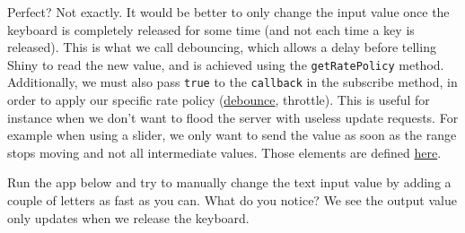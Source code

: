 \documentclass[
]{book}
\begin{document}
Perfect? Not exactly. It would be better to only change the input value once the keyboard is completely released for some time (and not each time a key is released). This is what we call debouncing, which allows a delay before telling Shiny to read the new value, and is achieved using the \texttt{getRatePolicy} method. Additionally, we must also pass \texttt{true} to the \texttt{callback} in the subscribe method, in order to apply our specific rate policy (\href{https://davidwalsh.name/javascript-debounce-function}{debounce}, throttle). This is useful for instance when we don't want to flood the server with useless update requests. For example when using a slider, we only want to send the value as soon as the range stops moving and not all intermediate values. Those elements are defined \href{https://github.com/rstudio/shiny/blob/master/srcjs/input_rate.js}{here}.

Run the app below and try to manually change the text input value by adding a couple of letters as fast as you can. What do you notice? We see the output value only updates when we release the keyboard.
\end{document}
